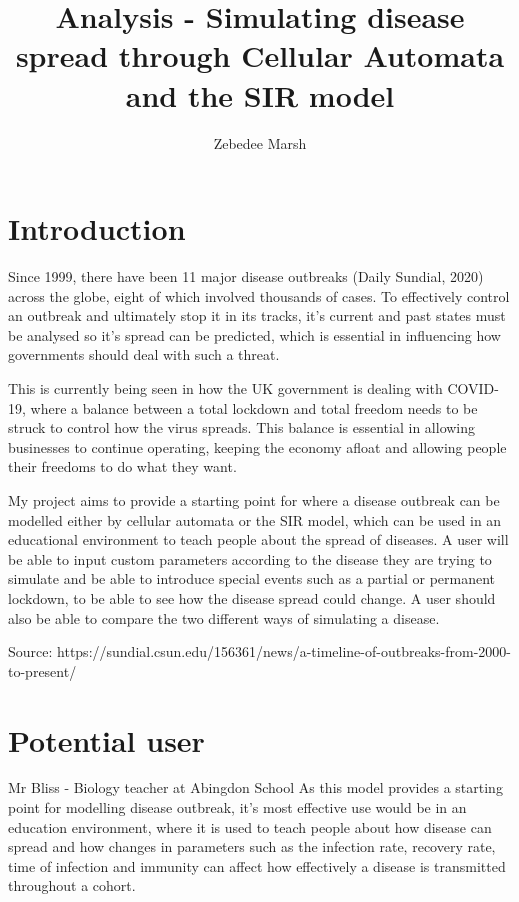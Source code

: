 \documentclass[11pt, a4paper]{article}
\author{Zebedee Marsh}
\title{Analysis - Simulating disease spread through Cellular Automata and the SIR model}
\begin{document}
    
\maketitle
\tableofcontents
\newpage

\section{Introduction}
Since 1999, there have been 11 major disease outbreaks (Daily Sundial, 2020) across the globe, eight of which involved thousands of cases. To effectively control an outbreak and ultimately stop it in its tracks, it's current and past states must be analysed so it's spread can be predicted, which is essential in influencing how governments should deal with such a threat.

This is currently being seen in how the UK government is dealing with COVID-19, where a balance between a total lockdown and total freedom needs to be struck to control how the virus spreads. This balance is essential in allowing businesses to continue operating, keeping the economy afloat and allowing people their freedoms to do what they want.

My project aims to provide a starting point for where a disease outbreak can be modelled either by cellular automata or the SIR model, which can be used in an educational environment to teach people about the spread of diseases. A user will be able to input custom parameters according to the disease they are trying to simulate and be able to introduce special events such as a partial or permanent lockdown, to be able to see how the disease spread could change. A user should also be able to compare the two different ways of simulating a disease.

Source: https://sundial.csun.edu/156361/news/a-timeline-of-outbreaks-from-2000-to-present/



\section{Potential user}
Mr Bliss - Biology teacher at Abingdon School
As this model provides a starting point for modelling disease outbreak, it’s most effective use would be in an education environment, where it is used to teach people about how disease can spread and how changes in parameters such as the infection rate, recovery rate, time of infection and immunity can affect how effectively a disease is transmitted throughout a cohort. 
\end{document}
